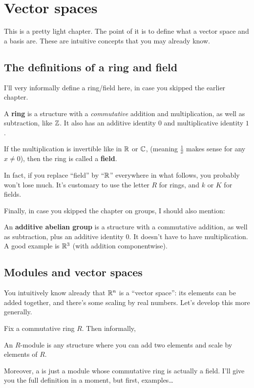 \chapter{Vector spaces}
\label{ch:vector_spaces}
This is a pretty light chapter.
The point of it is to define what a vector space and a basis are.
These are intuitive concepts that you may already know.

\section{The definitions of a ring and field}

I'll very informally define a ring/field here,
in case you skipped the earlier chapter.
\begin{itemize}
	\ii A \textbf{ring} is a structure with a \emph{commutative}
	addition and multiplication, as well as subtraction, like $\mathbb Z$.
	It also has an additive identity $0$ and multiplicative identity $1$.

	\ii If the multiplication is invertible like in $\mathbb R$ or $\mathbb C$,
	(meaning $\frac 1x$ makes sense for any $x \neq 0$),
	then the ring is called a \textbf{field}.
\end{itemize}
In fact, if you replace ``field'' by ``$\mathbb R$'' everywhere in what follows,
you probably won't lose much.
It's customary to use the letter $R$ for rings, and $k$ or $K$ for fields.

Finally, in case you skipped the chapter on groups, I should also mention:
\begin{itemize}
	\ii An \textbf{additive abelian group} is a structure
	with a commutative addition, as well as subtraction,
	plus an additive identity $0$.
	It doesn't have to have multiplication.
	A good example is $\mathbb R^3$ (with addition componentwise).
\end{itemize}

\section{Modules and vector spaces}
You intuitively know already that $\mathbb R^n$ is a ``vector space'':
its elements can be added together,
and there's some scaling by real numbers.
Let's develop this more generally.

Fix a commutative ring $R$.
Then informally,
\begin{moral}
	An $R$-module is any structure where you can add two elements
	and scale by elements of $R$.
\end{moral}
Moreover, a  is just a module whose commutative ring
is actually a field.
I'll give you the full definition in a moment,
but first, examples\dots


